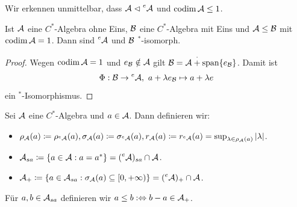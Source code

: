 Wir erkennen unmittelbar, dass $\mathcal{A} \vartriangleleft \prescript{e}{}{\mathcal{A}}$ und $\operatorname*{codim} \mathcal{A} \leq 1$.

\begin{proposition}
    Ist $\mathcal{A}$ eine $C^*$-Algebra ohne Eins, $\mathcal{B}$ eine $C^*$-Algebra mit Eins und $\mathcal{A} \leq \mathcal{B}$ mit $\operatorname*{codim} \mathcal{A} = 1$. Dann sind $\prescript{e}{}{\mathcal{A}}$ und $\mathcal{B}$ ${}^*$-isomorph.
\end{proposition}

\begin{proof}
    Wegen $\operatorname*{codim} \mathcal{A} = 1$ und $e_{\mathcal{B}} \notin \mathcal{A}$ gilt $\mathcal{B} = \mathcal{A} \overset{\cdot}{+} \mathrm{span} \{ e_{\mathcal{B}} \}$. Damit ist
    $$ \Phi : \mathcal{B} \to \prescript{e}{}{\mathcal{A}}, \ a + \lambda e_{\mathcal{B}} \mapsto a + \lambda e $$
    ein ${}^*$-Isomorphismus.
\end{proof}

\begin{definition}
    Sei $\mathcal{A}$ eine $C^*$-Algebra und $a \in \mathcal{A}$. Dann definieren wir:
    \begin{itemize}
        \item $\rho_{\mathcal{A}}(a) \coloneqq \rho_{\prescript{e}{}{\mathcal{A}}} (a), \sigma_{\mathcal{A}} (a) \coloneqq \sigma_{\prescript{e}{}{\mathcal{A}}} (a), r_{\mathcal{A}} (a) \coloneqq r_{\prescript{e}{}{\mathcal{A}}} (a) = \sup_{\lambda \in \rho_{\mathcal{A}} (a)} \vert \lambda \vert$.
        \item $\mathcal{A}_{sa} \coloneqq \{ a \in \mathcal{A} : a = a^* \} = (\prescript{e}{}{\mathcal{A}})_{sa} \cap \mathcal{A}$.
        \item $\mathcal{A}_+ \coloneqq \{ a \in \mathcal{A}_{sa} : \sigma_{\mathcal{A}} (a) \subseteq [0, +\infty) \} = (\prescript{e}{}{\mathcal{A}})_+ \cap \mathcal{A}$.
    \end{itemize}
    Für $a, b \in \mathcal{A}_{sa}$ definieren wir $a \leq b :\Leftrightarrow b - a \in \mathcal{A}_+$.
\end{definition}

